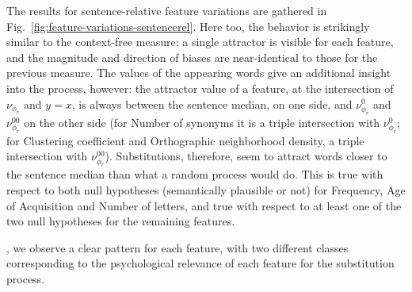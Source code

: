 \begin{new}
The results for sentence-relative feature variations are gathered in Fig.~\ref{fig:feature-variations-sentencerel}.
Here too, the behavior is strikingly similar to the context-free measure:
a single attractor is visible for each feature, and the magnitude and direction of biases are near-identical to those for the previous measure.
The values of the appearing words give an additional insight into the process, however:
the attractor value of a feature, at the intersection of $\nu_{\phi_r}$ and $y=x$, is always between the sentence median, on one side, and $\nu_{\phi_r}^0$ and $\nu_{\phi_r}^{00}$ on the other side (for Number of synonyms it is a triple intersection with $\nu_{\phi_r}^0$; for Clustering coefficient and Orthographic neighborhood density, a triple intersection with $\nu_{\phi_r}^{00}$).
Substitutions, therefore, seem to attract words closer to the sentence median than what a random process would do.
This is true with respect to both null hypotheses (semantically plausible or not) for Frequency, Age of Acquisition and Number of letters, and true with respect to at least one of the two null hypotheses for the remaining features.

\end{new}

\medskip

, we observe a clear  pattern for each feature, with two different classes corresponding to the psychological relevance of each feature for the substitution process.
